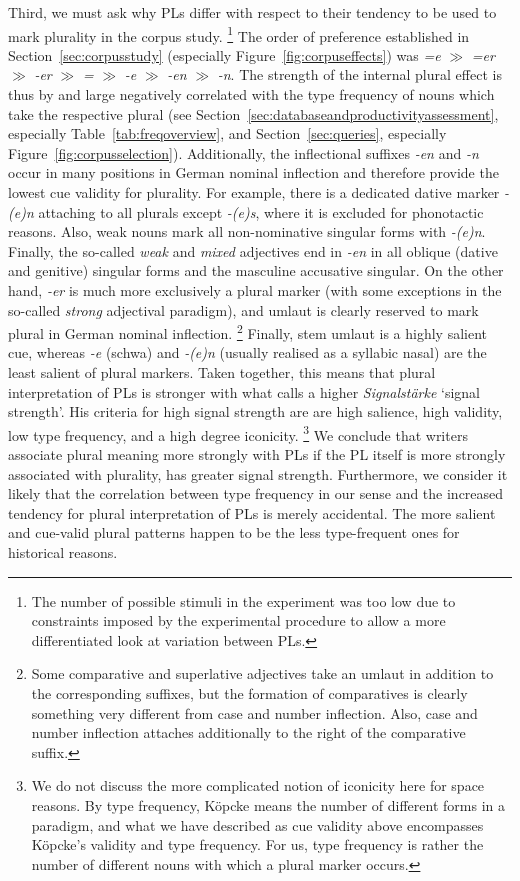 Third, we must ask why PLs differ with respect to their tendency to be used to mark plurality in the corpus study.%
\footnote{The number of possible stimuli in the experiment was too low due to constraints imposed by the experimental procedure to allow a more differentiated look at variation between PLs.}
The order of preference established in Section~\ref{sec:corpusstudy} (especially Figure~\ref{fig:corpuseffects}) was \textit{=e} $\gg$ \textit{=er} $\gg$ \textit{-er} $\gg$ \textit{=} $\gg$ \textit{-e} $\gg$ \textit{-en} $\gg$ \textit{-n}.
The strength of the internal plural effect is thus by and large negatively correlated with the type frequency of nouns which take the respective plural (see Section~\ref{sec:databaseandproductivityassessment}, especially Table~\ref{tab:freqoverview}, and Section~\ref{sec:queries}, especially Figure~\ref{fig:corpusselection}).
Additionally, the inflectional suffixes \textit{-en} and \textit{-n} occur in many positions in German nominal inflection and therefore provide the lowest cue validity for plurality.
For example, there is a dedicated dative marker \textit{-(e)n} attaching to all plurals except \textit{-(e)s}, where it is excluded for phonotactic reasons.
Also, weak nouns mark all non-nominative singular forms with \textit{-(e)n}.
Finally, the so-called \textit{weak} and \textit{mixed} adjectives end in \textit{-en} in all oblique (dative and genitive) singular forms and the masculine accusative singular.
On the other hand, \textit{-er} is much more exclusively a plural marker (with some exceptions in the so-called \textit{strong} adjectival paradigm), and umlaut is clearly reserved to mark plural in German nominal inflection.%
\footnote{Some comparative and superlative adjectives take an umlaut in addition to the corresponding suffixes, but the formation of comparatives is clearly something very different from case and number inflection.
Also, case and number inflection attaches additionally to the right of the comparative suffix.}
Finally, stem umlaut is a highly salient cue, whereas \textit{-e} (schwa) and \textit{-(e)n} (usually realised as a syllabic nasal) are the least salient of plural markers.
Taken together, this means that plural interpretation of PLs is stronger with what \textcite{Koepcke1993} calls a higher \textit{Signalstärke} `signal strength'.
His criteria for high signal strength are are high salience, high validity, low type frequency, and a high degree iconicity.%
\footnote{We do not discuss the more complicated notion of iconicity here for space reasons.
By type frequency, Köpcke means the number of different forms in a paradigm, and what we have described as cue validity above encompasses Köpcke's validity and type frequency.
For us, type frequency is rather the number of different nouns with which a plural marker occurs.}
We conclude that writers associate plural meaning more strongly with PLs if the PL itself is more strongly associated with plurality, \ie has greater signal strength.
Furthermore, we consider it likely that the correlation between type frequency in our sense and the increased tendency for plural interpretation of PLs is merely accidental.
The more salient and cue-valid plural patterns happen to be the less type-frequent ones for historical reasons.

